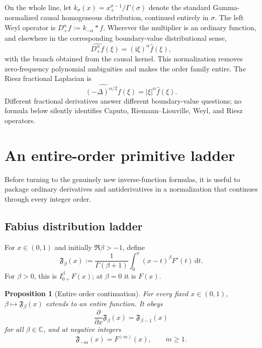 \documentclass[11pt,oneside]{article}
\newtheorem{proposition}[theorem]{Proposition}
\theoremstyle{definition}
\theoremstyle{remark}
\newcommand{\C}{\mathbb C}
\newcommand{\dd}{\,\mathrm d}
\newcommand{\ii}{\mathrm i}
\newcommand{\1}{\mathbf 1}
\begin{document}
On the whole line, let
$k_\sigma(x)=x_+^{\sigma-1}/\Gamma(\sigma)$ denote the standard
Gamma-normalized causal homogeneous distribution, continued entirely in
$\sigma$.  The left Weyl operator is
$D_+^\alpha f:=k_{-\alpha}*f$.  Wherever the multiplier is an ordinary
function, and elsewhere in the corresponding boundary-value distributional
sense,
\begin{equation}
 \widehat{D_+^\alpha f}(\xi)=(\ii\xi)^\alpha\widehat f(\xi),
 \label{p11:eq:Weyl-def}
\end{equation}
with the branch obtained from the causal kernel.  This normalization removes
zero-frequency polynomial ambiguities and makes the order family entire.  The
Riesz fractional Laplacian is
\begin{equation}
 \widehat{(-\Delta)^{\alpha/2}f}(\xi)=|\xi|^\alpha\widehat f(\xi).
 \label{p11:eq:Riesz-def}
\end{equation}
Different fractional derivatives answer different boundary-value questions;
no formula below silently identifies Caputo, Riemann--Liouville, Weyl, and
Riesz operators.

\section{An entire-order primitive ladder}
\label{p11:sec:entire-ladder}

Before turning to the genuinely new inverse-function formulas, it is useful
to package ordinary derivatives and antiderivatives in a normalization that
continues through every integer order.

\subsection{Fabius distribution ladder}

For $x\in(0,1)$ and initially $\Re\beta>-1$, define
\begin{equation}
 \mathfrak F_\beta(x)
 :=\frac1{\Gamma(\beta+1)}
   \int_0^x(x-t)^\beta F'(t)\dd t.
 \label{p11:eq:F-entire-ladder}
\end{equation}
For $\beta>0$, this is $I_{0+}^{\beta}F(x)$; at $\beta=0$ it is $F(x)$.

\begin{proposition}[Entire order continuation]
For every fixed $x\in(0,1)$, $\beta\mapsto\mathfrak F_\beta(x)$ extends to an
entire function.  It obeys
\begin{equation}
 \frac{\partial}{\partial x}\mathfrak F_\beta(x)
 =\mathfrak F_{\beta-1}(x)
 \label{p11:eq:F-order-ladder}
\end{equation}
for all $\beta\in\C$, and at negative integers
\begin{equation}
 \mathfrak F_{-m}(x)=F^{(m)}(x),\qquad m\ge1.
 \label{p11:eq:F-negative-orders}
\end{equation}
\end{proposition}
\end{document}
